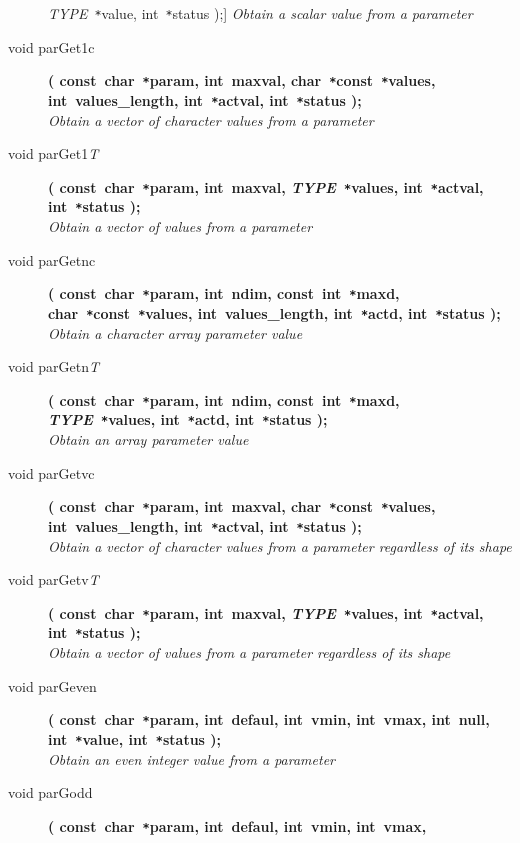 \documentclass[twoside,11pt]{article}
\newcommand{\listline}{\hspace{1pt}\\}
\renewcommand{\listline}{}
\begin{document}
\begin{flushleft}
\begin{description}
  \textit{TYPE}~\texttt{*}value, int~\texttt{*}status );] \listline
\textit{Obtain a scalar value from a parameter}
\item[void parGet1c]
\textbf{( const~char~\texttt{*}param, int~maxval, 
               char~\texttt{*}const~\texttt{*}values, int~values\_length,
               int~\texttt{*}actval, int~\texttt{*}status );} \\
\textit{Obtain a vector of character values from a parameter}
\item[void parGet1\textit{T}]
\textbf{( const~char~\texttt{*}param, int~maxval, 
               \textit{TYPE}~\texttt{*}values, int~\texttt{*}actval,
               int~\texttt{*}status );} \\
\textit{Obtain a vector of values from a parameter}
\item[void parGetnc]
\textbf{( const~char~\texttt{*}param, int~ndim, const~int~\texttt{*}maxd, 
               char~\texttt{*}const~\texttt{*}values, int~values\_length,
               int~\texttt{*}actd, int~\texttt{*}status );} \\
\textit{Obtain a character array parameter value}
\item[void parGetn\textit{T}]
\textbf{( const~char~\texttt{*}param, int~ndim, const~int~\texttt{*}maxd,
               \textit{TYPE}~\texttt{*}values, int~\texttt{*}actd,
               int~\texttt{*}status );} \\
\textit{Obtain an array parameter value}
\item[void parGetvc]
\textbf{( const~char~\texttt{*}param, int~maxval, 
               char~\texttt{*}const~\texttt{*}values, int~values\_length,
               int~\texttt{*}actval, int~\texttt{*}status );} \\
\textit{Obtain a vector of character values from a parameter regardless of its
               shape}
\item[void parGetv\textit{T}]
\textbf{( const~char~\texttt{*}param, int~maxval, 
               \textit{TYPE}~\texttt{*}values, int~\texttt{*}actval,
               int~\texttt{*}status );} \\
\textit{Obtain a vector of values from a parameter regardless of its shape}
\item[void parGeven]
\textbf{( const~char~\texttt{*}param, int~defaul, int~vmin, int~vmax,
               int~null, int~\texttt{*}value, int~\texttt{*}status );} \\
\textit{Obtain an even integer value from a parameter}
\item[void parGodd]
\textbf{( const~char~\texttt{*}param, int~defaul, int~vmin, int~vmax,
}
\end{description}
\end{flushleft}
\end{document}
